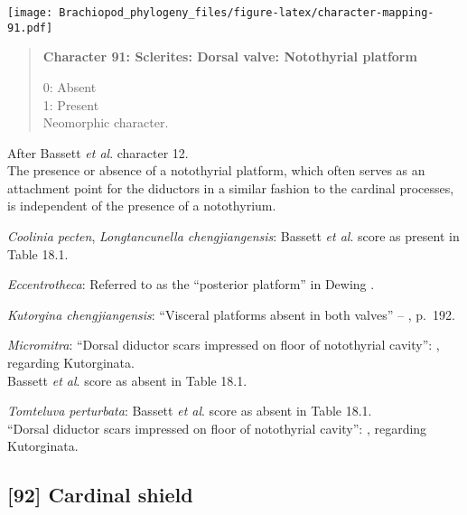 \documentclass[openany]{book}
\theoremstyle{definition}
\theoremstyle{definition}
\theoremstyle{definition}
\theoremstyle{remark}
\begin{document}
\texttt{[image: Brachiopod\_phylogeny\_files/figure-latex/character-mapping-91.pdf]}

\begin{quote}
\textbf{Character 91: Sclerites: Dorsal valve: Notothyrial platform}

0: Absent\\
1: Present\\
Neomorphic character.
\end{quote}

After Bassett \emph{et al}.
\citeyearpar{Bassett2001Functionalmorphology} character 12.\\
The presence or absence of a notothyrial platform, which often serves as
an attachment point for the diductors in a similar fashion to the
cardinal processes, is independent of the presence of a notothyrium.

\hypertarget{Coolinia_pecten-coding-91}{}
\emph{Coolinia pecten}, \emph{Longtancunella chengjiangensis}: Bassett
\emph{et al}. \citeyearpar{Bassett2001Functionalmorphology} score as
present in Table 18.1.

\hypertarget{Eccentrotheca-coding-91}{}
\emph{Eccentrotheca}: Referred to as the ``posterior platform'' in
Dewing \citeyearpar{Dewing2001Hingemodifications}.

\hypertarget{Kutorgina_chengjiangensis-coding-91}{}
\emph{Kutorgina chengjiangensis}: ``Visceral platforms absent in both
valves'' -- \citet{Williams2000LinguliformeaCraniiformea}, p.~192.

\hypertarget{Micromitra-coding-91}{}
\emph{Micromitra}: ``Dorsal diductor scars impressed on floor of
notothyrial cavity'': \citet{Williams2000LinguliformeaCraniiformea},
regarding Kutorginata.\\
Bassett \emph{et al}. \citeyearpar{Bassett2001Functionalmorphology}
score as absent in Table 18.1.

\hypertarget{Tomteluva_perturbata-coding-91}{}
\emph{Tomteluva perturbata}: Bassett \emph{et al}.
\citeyearpar{Bassett2001Functionalmorphology} score as absent in Table
18.1.\\
``Dorsal diductor scars impressed on floor of notothyrial cavity'':
\citet{Williams2000LinguliformeaCraniiformea}, regarding Kutorginata.

\subsection*{{[}92{]} Cardinal shield}\label{cardinal-shield}
\end{document}
